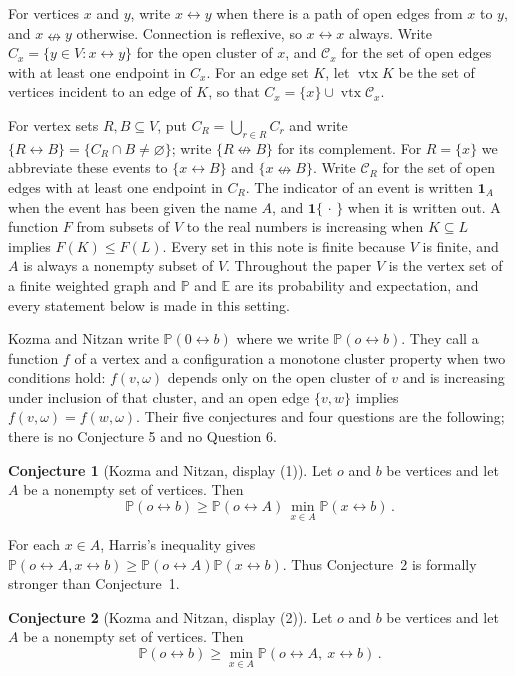 \documentclass[11pt]{article}
\theoremstyle{definition}
\newtheorem{conjecture}{Conjecture}
\theoremstyle{remark}
\newcommand{\PP}{\mathbb P}
\newcommand{\EE}{\mathbb E}
\newcommand{\one}{\mathbf 1}
\newcommand{\con}{\leftrightarrow}
\newcommand{\ncon}{\nleftrightarrow}
\newcommand{\eC}{\mathcal C}
\DeclareMathOperator{\vtx}{vtx}
\begin{document}
For vertices $x$ and $y$, write $x\con y$ when there is a path of open edges from $x$ to
$y$, and $x\ncon y$ otherwise. Connection is reflexive, so $x\con x$ always. Write
$C_x=\{y\in V:x\con y\}$ for the open cluster of $x$, and $\eC_x$ for the set of open edges
with at least one endpoint in $C_x$. For an edge set $K$, let $\vtx K$ be the set of
vertices incident to an edge of $K$, so that $C_x=\{x\}\cup\vtx\eC_x$.

For vertex sets $R,B\subseteq V$, put $C_R=\bigcup_{r\in R}C_r$ and write
$\{R\con B\}=\{C_R\cap B\neq\varnothing\}$; write $\{R\ncon B\}$ for its complement. For
$R=\{x\}$ we abbreviate these events to $\{x\con B\}$ and $\{x\ncon B\}$. Write $\eC_R$
for the set of open edges with at least one endpoint in $C_R$. The indicator of an
event is written $\one_A$ when the event has been given the name $A$, and
$\one\{\,\cdot\,\}$ when it is written out. A function $F$ from subsets of $V$ to the real
numbers is increasing when $K\subseteq L$ implies $F(K)\leq F(L)$. Every set in this note is
finite because $V$ is finite, and $A$ is always a nonempty subset of $V$. Throughout the
paper $V$ is the vertex set of a finite weighted graph and $\PP$ and $\EE$ are its
probability and expectation, and every statement below is made in this setting.

Kozma and Nitzan write $\PP(0\con b)$ where we write $\PP(o\con b)$. They call a function
$f$ of a vertex and a configuration a monotone cluster property when two conditions hold:
$f(v,\omega)$ depends only on the open cluster of $v$ and is increasing under inclusion of
that cluster, and an open edge $\{v,w\}$ implies $f(v,\omega)=f(w,\omega)$. Their five conjectures and four questions are the
following; there is no Conjecture 5 and no Question 6.

\begin{conjecture}[Kozma and Nitzan, display (1)]\label{c1}
Let $o$ and $b$ be vertices and let $A$ be a nonempty set of vertices. Then
\[
 \PP(o\con b)\geq \PP(o\con A)\,\min_{x\in A}\PP(x\con b)\,.
\]
\end{conjecture}

For each $x\in A$, Harris's inequality gives
$\PP(o\con A,x\con b)\geq\PP(o\con A)\PP(x\con b)$. Thus Conjecture~2 is formally stronger
than Conjecture~1.

\begin{conjecture}[Kozma and Nitzan, display (2)]\label{c2}
Let $o$ and $b$ be vertices and let $A$ be a nonempty set of vertices. Then
\[
 \PP(o\con b)\geq \min_{x\in A}\PP(o\con A,\ x\con b)\,.
\]
\end{conjecture}
\end{document}
